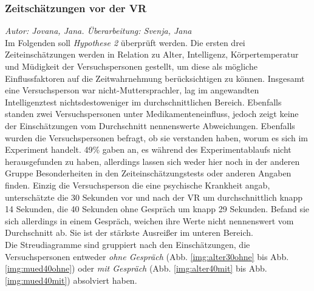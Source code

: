 \documentclass{Paper}
\begin{document}
\subsubsection{Zeitschätzungen vor der VR}
 \textit{Autor: Jovana, Jana. Überarbeitung: Svenja, Jana}\\
Im Folgenden soll \textit{Hypothese 2} überprüft werden. Die ersten drei Zeiteinschätzungen werden in Relation zu  Alter, Intelligenz, Körpertemperatur und Müdigkeit der Versuchspersonen gestellt, um diese als mögliche Einflussfaktoren auf die Zeitwahrnehmung berücksichtigen zu können. Insgesamt eine Versuchsperson war nicht-Muttersprachler, lag im angewandten Intelligenztest nichtsdestoweniger im durchschnittlichen Bereich. Ebenfalls standen zwei Versuchspersonen unter Medikamenteneinfluss, jedoch zeigt keine der Einschätzungen vom Durchschnitt nennenswerte Abweichungen. Ebenfalls wurden die Versuchspersonen befragt, ob sie verstanden haben, worum es sich im Experiment handelt. 49\% gaben an, es während des Experimentablaufs nicht herausgefunden zu haben, allerdings lassen sich weder hier noch in der anderen Gruppe Besonderheiten in den Zeiteinschätzungstests oder anderen Angaben finden.
Einzig die Versuchsperson die eine psychische Krankheit angab, unterschätzte die 30 Sekunden vor und nach der VR um durchschnittlich knapp 14 Sekunden, die 40 Sekunden ohne Gespräch um knapp 29 Sekunden. Befand sie sich allerdings in einem Gespräch, weichen ihre Werte nicht nennenswert vom Durchschnitt ab. Sie ist der stärkste Ausreißer im unteren Bereich.\\
Die Streudiagramme sind gruppiert nach den Einschätzungen, die Versuchspersonen entweder \textit{ohne Gespräch} (Abb. \ref{img:alter30ohne} bis Abb. \ref{img:mued40ohne}) oder \textit{mit Gespräch} (Abb. \ref{img:alter40mit} bis Abb. \ref{img:mued40mit}) absolviert haben.
\end{document}
